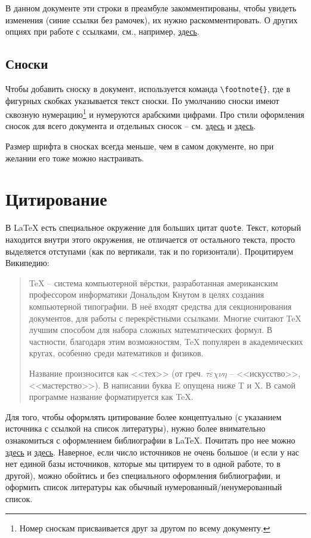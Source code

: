 \documentclass[12pt]{article}
\begin{document}
В данном документе эти строки в преамбуле закомментированы, чтобы увидеть изменения (синие ссылки без рамочек), их нужно раскомментировать. О других опциях при работе с ссылками, см., например, \href{https://ru.sharelatex.com/learn/Hyperlinks}{здесь}.
   	
\subsection{Сноски}

Чтобы добавить сноску в документ, используется команда \texttt{\textbackslash{footnote}\{\}}, где в фигурных скобках указывается текст сноски. По умолчанию сноски имеют сквозную нумерацию\footnote{ Номер сноскам присваивается друг за другом по всему документу.} и нумеруются арабскими цифрами. Про стили оформления сносок для всего документа и отдельных сносок -- см. \href{https://ru.sharelatex.com/learn/Footnotes}{здесь} и \href{https://en.wikibooks.org/wiki/LaTeX/Footnotes_and_Margin_Notes}{здесь}.

Размер шрифта в сносках всегда меньше, чем в самом документе, но при желании его тоже можно настраивать. 

\section{Цитирование}

В \LaTeX{} есть специальное окружение для больших цитат \texttt{quote}. Текст, который находится внутри этого окружения, не отличается от остального текста, просто выделяется отступами (как по вертикали, так и по горизонтали). Процитируем Википедию:

\begin{quote}
TeX -- система компьютерной вёрстки, разработанная американским профессором информатики Дональдом Кнутом в целях создания компьютерной типографии. В неё входят средства для секционирования документов, для работы с перекрёстными ссылками. Многие считают TeX лучшим способом для набора сложных математических формул. В частности, благодаря этим возможностям, TeX популярен в академических кругах, особенно среди математиков и физиков.

Название произносится как <<тех>> (от греч. $\tau\acute{\varepsilon}\chi\nu\eta$ -- <<искусство>>, <<мастерство>>). В написании буква E опущена ниже T и X. В самой программе название форматируется как \TeX{}.
\end{quote}

Для того, чтобы оформлять цитирование более концептуально (с указанием источника с ссылкой на список литературы), нужно более внимательно ознакомиться с оформлением библиографии в \LaTeX{}. Почитать про нее можно \href{https://en.wikibooks.org/wiki/LaTeX/Bibliography_Management}{здесь} и \href{https://ru.sharelatex.com/learn/Bibliography_management_in_LaTeX}{здесь}. Наверное, если число источников не очень большое (и если у нас нет единой базы источников, которые мы цитируем то в одной работе, то в другой), можно обойтись и без специального оформления библиографии, и оформить список литературы как обычный нумерованный/ненумерованный  список.
\end{document}
